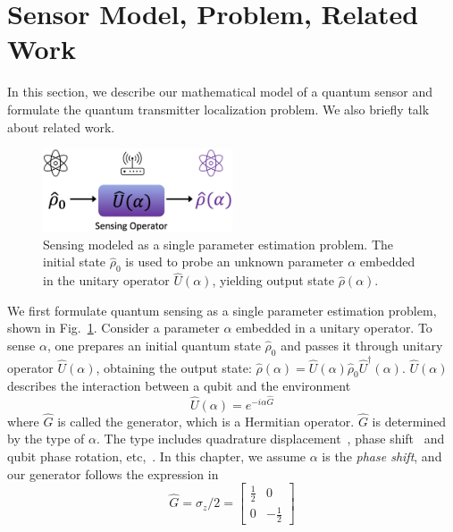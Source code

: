 \section{Sensor Model, Problem, Related Work}
\label{sec:quantum_problem}

In this section, we describe our mathematical model of a quantum sensor and formulate the quantum transmitter localization problem.
We also briefly talk about related work.

\begin{figure}[h]
    \centering
    \includegraphics[width=0.5\textwidth]{chapters/qce/figures/unitary.png}
    \caption{Sensing modeled as a single parameter estimation problem. The initial state $\hat{\rho}_{0}$ is used to probe an unknown parameter $\alpha$ embedded in the unitary operator $\hat{U}(\alpha)$, yielding output state $\hat{\rho}(\alpha)$.}
    \label{fig:unitary}
\end{figure}
 We first formulate quantum sensing as a single parameter estimation problem, shown in Fig.~\ref{fig:unitary}.
Consider a parameter $\alpha$ embedded in a unitary operator.
To sense $\alpha$, one prepares an initial quantum state $\hat{\rho}_{0}$ and passes it through unitary operator $\hat{U}(\alpha)$, obtaining the output state:
$\hat{\rho}(\alpha) = \hat{U}(\alpha) \hat{\rho}_{0} \hat{U}^{\dagger}(\alpha)$.
$\hat{U}(\alpha)$ describes the interaction between a qubit and the environment~\cite{arizona21-thesis}
\begin{equation}
    \hat{U}(\alpha) = e^{-i\alpha \hat{G}}
    \label{equ:unitary_generator}
\end{equation}
where $\hat{G}$ is called the generator, which is a Hermitian operator.
$\hat{G}$ is determined by the type of $\alpha$.
The type includes quadrature displacement~\cite{PRL20-qsn}, phase shift~\cite{nature21_phase} and qubit phase rotation, etc,~\cite{Zhang_2021}. 
In this chapter, we assume $\alpha$ is the \emph{phase shift}, and our generator follows the expression in~\cite{nature21_phase}
\begin{equation}
    \hat{G} = \sigma_z / 2 = 
    \begin{bmatrix}
    \frac{1}{2} & 0\\
    0 & -\frac{1}{2}
    \end{bmatrix}
    \label{equ:generator}
\end{equation}
